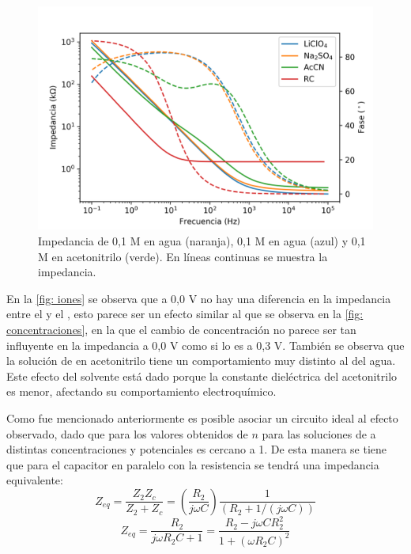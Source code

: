 \documentclass[fleqn,11pt]{SelfArx}
\begin{document}
	\begin{figure}[h]
		\centering
		\includegraphics[width = \linewidth]{Iones}
		\caption{Impedancia de  0,1 M en agua (naranja),  0,1 M en agua (azul) y 0,1 M en acetonitrilo (verde). En l\'ineas continuas se muestra la impedancia.}
		\label{fig: iones}
	\end{figure}
	
	En la \autoref{fig: iones} se observa que a 0,0 V no hay una diferencia en la impedancia entre el  y el , esto parece ser un efecto similar al que se observa en la \autoref{fig: concentraciones}, en la que el cambio de concentración no parece ser tan influyente en la impedancia a 0,0 V como si lo es a 0,3 V. También se observa que la solución de  en acetonitrilo tiene un comportamiento muy distinto al del agua. Este efecto del solvente está dado porque la constante dieléctrica del acetonitrilo es menor, afectando su comportamiento electroquímico. 
	
	Como fue mencionado anteriormente es posible asociar un circuito ideal al efecto observado, dado que para los valores obtenidos de $n$ para las soluciones de  a distintas concentraciones y potenciales es cercano a 1. De esta manera se tiene que para el capacitor en paralelo con la resistencia se tendr\'a una impedancia equivalente:
	\begin{equation*}
		Z_{eq} = \dfrac{Z_2Z_c}{Z_2 + Z_c} = \left(\dfrac{R_2}{j\omega C}\right)\dfrac{1}{(R_2 + 1/(j\omega C))}
	\end{equation*}
	\begin{equation}
		Z_{eq} = \dfrac{R_2}{j\omega R_2C + 1} = \dfrac{R_2 - j\omega CR_2^2}{1+(\omega R_2C)^2}
	\end{equation}
	
\end{document}
